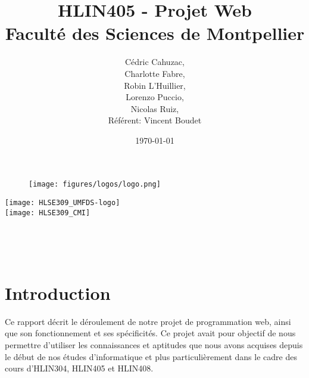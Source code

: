 \documentclass[12pt]{report}
\begin{document}
    \begin{figure}
		\centering
			\texttt{[image: figures/logos/logo.png]}
	\end{figure}

	\title{	HLIN405 - Projet Web \\
	Faculté des Sciences de Montpellier \\}
		
	\author{Cédric Cahuzac,\\ Charlotte Fabre,\\ Robin L'Huillier,\\ Lorenzo Puccio,\\ Nicolas Ruiz,\\ \bigskip Référent: Vincent Boudet}
	\date{\today}

		\begin{titlingpage}
			\begin{center}
				\texttt{[image: HLSE309\_UMFDS-logo]} \\
				\vspace{2cm}
				\texttt{[image: HLSE309\_CMI]} \\
				\vspace{1cm}
				\begin{huge}\thetitle\end{huge} \\
				\vspace{2cm}
				\begin{large}\theauthor\end{large} \\
				\vspace{2cm} 
				\thedate
			\end{center}
		\end{titlingpage}
		\tableofcontents

		\chapter{Introduction}
		\par
        Ce rapport décrit le déroulement de notre projet de programmation web, ainsi que son fonctionnement et ses spécificités. Ce projet avait pour objectif de nous permettre d’utiliser les connaissances et aptitudes que nous avons acquises depuis le début de nos études d’informatique et plus particulièrement dans le cadre des cours d’HLIN304, HLIN405 et HLIN408.
		    
\end{document}
